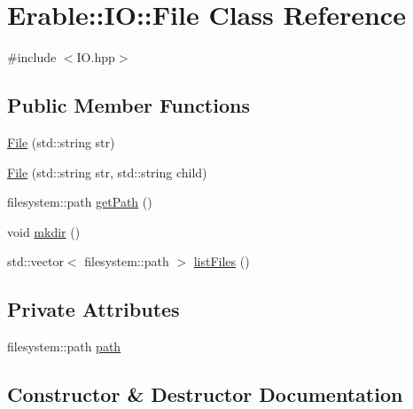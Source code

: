 \hypertarget{class_erable_1_1_i_o_1_1_file}{}\section{Erable\+::IO\+::File Class Reference}
\label{class_erable_1_1_i_o_1_1_file}


{\ttfamily \#include $<$I\+O.\+hpp$>$}

\subsection*{Public Member Functions}
\begin{DoxyCompactItemize}
\item 
\mbox{\hyperlink{class_erable_1_1_i_o_1_1_file_a1081c07bd92ad5d67de5206bef5d9ee0}{File}} (std\+::string str)
\item 
\mbox{\hyperlink{class_erable_1_1_i_o_1_1_file_a1032497e721249b1cacfce0daf8d6cac}{File}} (std\+::string str, std\+::string child)
\item 
filesystem\+::path \mbox{\hyperlink{class_erable_1_1_i_o_1_1_file_afab30f5dd8c9f1100f2a43c878bf61f1}{get\+Path}} ()
\item 
void \mbox{\hyperlink{class_erable_1_1_i_o_1_1_file_ab3690b8b34c69e5fdeaa1919e0c2d65d}{mkdir}} ()
\item 
std\+::vector$<$ filesystem\+::path $>$ \mbox{\hyperlink{class_erable_1_1_i_o_1_1_file_a6a33109bcec2e9c38aff67d9e279218a}{list\+Files}} ()
\end{DoxyCompactItemize}
\subsection*{Private Attributes}
\begin{DoxyCompactItemize}
\item 
filesystem\+::path \mbox{\hyperlink{class_erable_1_1_i_o_1_1_file_ac03fd0242a8e743fb874e84738fcb8cf}{path}}
\end{DoxyCompactItemize}


\subsection{Constructor \& Destructor Documentation}
\mbox{\label{class_erable_1_1_i_o_1_1_file_a1081c07bd92ad5d67de5206bef5d9ee0}} 
